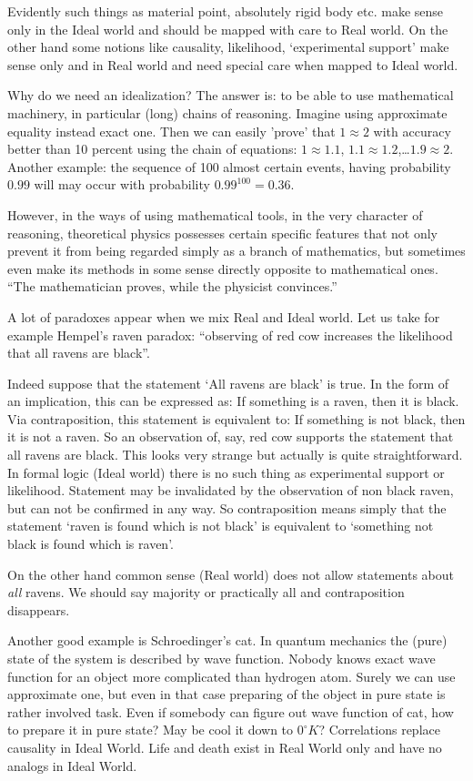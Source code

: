Evidently such things as material point, absolutely rigid body etc.  make sense only in the Ideal world
 and should be mapped with care to Real world. 
On the other hand
some notions like causality,  likelihood,
`experimental support' make sense only and in Real world and need 
special care when mapped to Ideal world. 

Why do we need an idealization? The answer is: to be able to use mathematical machinery, in 
particular (long) chains of reasoning. Imagine using  approximate equality instead exact one.
Then we can easily 'prove' that $ 1 \approx 2 $ with accuracy better than 10 percent
using the chain of equations: $ 1 \approx  1.1$, $1.1 \approx 1.2$,\ldots  $  1.9 \approx 2 $.
Another example: the sequence of 100 almost certain events, having probability $0.99$ will
may occur with probability $0.99^{100} = 0.36$. 

However, in the ways of using mathematical tools, in the very character
of reasoning, theoretical physics possesses certain specific features
that not only prevent it from being regarded simply as a branch of
mathematics, but sometimes even make its methods in some sense directly
opposite to mathematical ones.
 “The mathematician proves, while the physicist convinces.” \cite{Medvedev}

A lot of paradoxes appear when we mix Real and Ideal world. 
Let us take for example  Hempel's raven paradox: ``observing
of red cow increases the likelihood 
that all ravens are black''. 

Indeed suppose that the statement `All ravens are black' is true.
In the form of an 
implication, this can be expressed as: If something is a raven, then it 
is black. Via contraposition, this statement is equivalent to: If something is 
not black, then it is not a raven. So an observation of, say, red cow supports 
the statement that all ravens are black. This looks very strange but actually is quite
straightforward. In formal logic (Ideal world) there is no such thing as experimental support or
likelihood. Statement may be invalidated by the observation of non black raven, 
but can not be confirmed in any way. So contraposition means simply that the 
statement `raven is found which is not black' is equivalent to 
`something not black is found which is raven'. 

On the other hand common sense (Real world) does not allow statements about 
{\em all} ravens. We should say majority or practically all 
and  contraposition  disappears.

Another good example is Schroedinger's cat. In quantum mechanics the (pure) state of the system is described 
by wave function. Nobody knows exact wave function for an object more complicated than hydrogen atom. 
Surely we can use approximate one, but even in that case preparing of the object in pure state
is rather involved task.  Even if somebody can figure out wave function of cat, how to prepare it
in pure state? May be cool it down to $0^\circ K$? Correlations replace causality in Ideal World.
 Life and death exist in Real World only and have no analogs in Ideal World.
